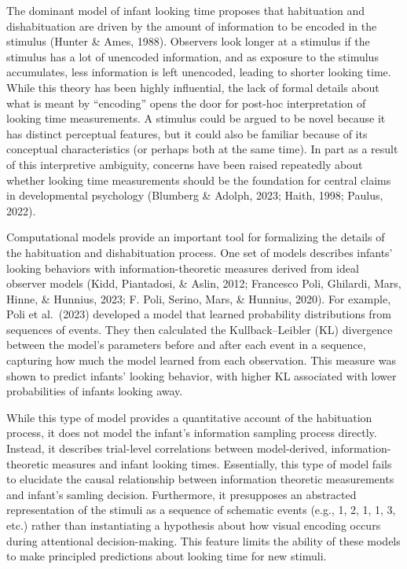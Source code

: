 \documentclass[10pt, letterpaper]{article}
\begin{document}
The dominant model of infant looking time proposes that habituation and
dishabituation are driven by the amount of information to be encoded in
the stimulus (Hunter \& Ames, 1988). Observers look longer at a stimulus
if the stimulus has a lot of unencoded information, and as exposure to
the stimulus accumulates, less information is left unencoded, leading to
shorter looking time. While this theory has been highly influential, the
lack of formal details about what is meant by ``encoding'' opens the
door for post-hoc interpretation of looking time measurements. A
stimulus could be argued to be novel because it has distinct perceptual
features, but it could also be familiar because of its conceptual
characteristics (or perhaps both at the same time). In part as a result
of this interpretive ambiguity, concerns have been raised repeatedly
about whether looking time measurements should be the foundation for
central claims in developmental psychology (Blumberg \& Adolph, 2023;
Haith, 1998; Paulus, 2022).

Computational models provide an important tool for formalizing the
details of the habituation and dishabituation process. One set of models
describes infants' looking behaviors with information-theoretic measures
derived from ideal observer models (Kidd, Piantadosi, \& Aslin, 2012;
Francesco Poli, Ghilardi, Mars, Hinne, \& Hunnius, 2023; F. Poli,
Serino, Mars, \& Hunnius, 2020). For example, Poli et al.~(2023)
developed a model that learned probability distributions from sequences
of events. They then calculated the Kullback--Leibler (KL) divergence
between the model's parameters before and after each event in a
sequence, capturing how much the model learned from each observation.
This measure was shown to predict infants' looking behavior, with higher
KL associated with lower probabilities of infants looking away.

While this type of model provides a quantitative account of the
habituation process, it does not model the infant's information sampling
process directly. Instead, it describes trial-level correlations between
model-derived, information-theoretic measures and infant looking times.
Essentially, this type of model fails to elucidate the causal
relationship between information theoretic measurements and infant's
samling decision. Furthermore, it presupposes an abstracted
representation of the stimuli as a sequence of schematic events (e.g.,
1, 2, 1, 1, 3, etc.) rather than instantiating a hypothesis about how
visual encoding occurs during attentional decision-making. This feature
limits the ability of these models to make principled predictions about
looking time for new stimuli.
\end{document}
